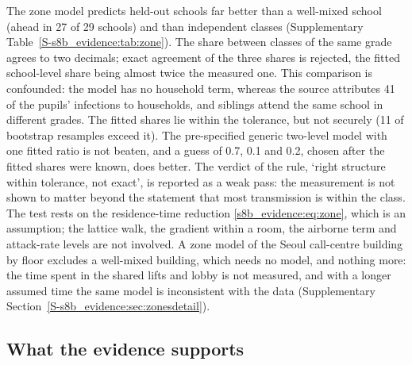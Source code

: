 The zone model predicts held-out schools far better than a well-mixed school (ahead in 27 of 29 schools) and
than independent classes (Supplementary Table~\ref{S-s8b_evidence:tab:zone}). The share between classes of the same grade agrees
to two decimals; exact agreement of the three shares is rejected, the fitted school-level share being almost
twice the measured one. This comparison is confounded: the model has no household term, whereas the source
attributes 41\pct{} of the pupils' infections to households, and siblings attend the same school in different
grades. The fitted shares lie within the tolerance, but not securely (11\pct{} of bootstrap resamples exceed
it). The pre-specified generic two-level model with one fitted ratio is not beaten, and a guess of 0.7, 0.1 and
0.2, chosen after the fitted shares were known, does better. The verdict of the rule, `right structure within
tolerance, not exact', is reported as a weak pass: the measurement is not shown to matter beyond the statement
that most transmission is within the class. The test rests on the residence-time reduction
\eqref{s8b_evidence:eq:zone}, which is an assumption; the lattice walk, the gradient within a room, the airborne
term and attack-rate levels are not involved. A zone model of the Seoul call-centre building by floor excludes a
well-mixed building, which needs no model, and nothing more: the time spent in the shared lifts and lobby is not
measured, and with a longer assumed time the same model is inconsistent with the data (Supplementary
Section~\ref{S-s8b_evidence:sec:zonesdetail}).

\subsection{What the evidence supports}\label{s8b_evidence:sec:overall}\label{s8_outbreaks:sec:verdict}

